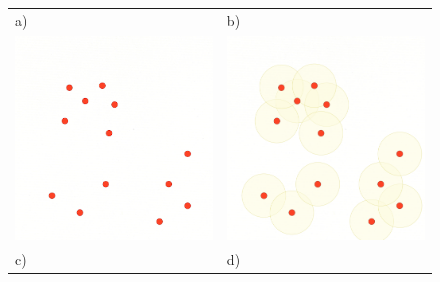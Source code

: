 \documentclass{article}
\begin{document}
\begin{figure}[p]
\centering
\begin{tabular}{ p{79mm}p{79mm} }
a) & b) \\
\includegraphics[width=78mm,frame=0.01cm]{Large/Fig.png} & \includegraphics[width=78mm,frame=0.01cm]{Large/Fig2.png} \\
c) & d) \\

\end{tabular}
\end{figure}
\end{document}
